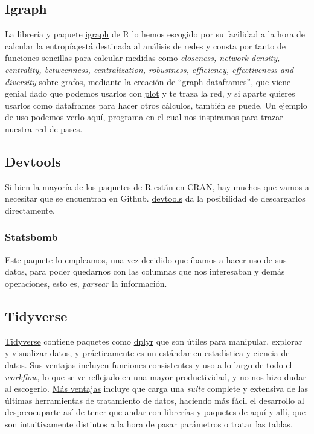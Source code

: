 \subsection{Igraph}
La librería y paquete \href{https://igraph.org/r/}{igraph} de R lo hemos escogido por su facilidad a la hora de 
calcular la entropía;está destinada al análisis de redes y consta por tanto de \href{https://kateto.net/netscix2016.html}{funciones sencillas} para calcular 
medidas como \textit{closeness, network density, centrality, betweenness, centralization, robustness, 
efficiency, effectiveness and diversity} sobre grafos, mediante la 
creación de \href{https://igraph.org/r/doc/graph_from_data_frame.html}{``graph dataframes''}, que viene genial 
dado que podemos usarlos con \href{https://www.rdocumentation.org/packages/graphics/versions/3.6.2/topics/plot}{plot} 
y te traza la red, y si aparte quieres usarlos como dataframes para hacer otros cálculos, también se puede. Un ejemplo 
de uso podemos verlo \href{https://github.com/JJ/venice-patrician-social-network/blob/main/patrician-social-network.R}{aquí}, 
programa en el cual nos inspiramos para trazar nuestra red de pases.

\subsection{Devtools}
Si bien la mayoría de los paquetes de R están en \href{https://cran.r-project.org/}{CRAN}, hay muchos que vamos 
a necesitar que se encuentran en Github. \href{https://www.r-project.org/nosvn/pandoc/devtools.html}{devtools} da 
la posibilidad de descargarlos directamente.

\subsubsection{Statsbomb}
\href{https://github.com/statsbomb/StatsBombR}{Este paquete} lo empleamos, una vez decidido que íbamos a hacer 
uso de sus datos, para poder quedarnos con las columnas que nos interesaban y demás operaciones, esto es, \textit{parsear} 
la información. 

\subsection{Tidyverse}
\href{http://www.storybench.org/getting-started-with-tidyverse-in-r/}{Tidyverse} contiene paquetes como 
\href{https://dplyr.tidyverse.org/}{dplyr} que son útiles para manipular, explorar y visualizar datos, y 
prácticamente es un estándar en estadística y ciencia de datos. \href{https://rviews.rstudio.com/2017/06/08/what-is-the-tidyverse/}{Sus ventajas} 
incluyen funciones consistentes y uso a lo largo de todo el \textit{workflow}, lo que se ve reflejado en una 
mayor productividad, y no nos hizo dudar al escogerlo. \href{https://www.r-bloggers.com/2018/09/why-learn-the-tidyverse/}{Más ventajas} incluye 
que carga una \textit{suite} complete y extensiva de las últimas herramientas de tratamiento de datos, haciendo más 
fácil el desarrollo al despreocuparte así de tener que andar con librerías y paquetes de aquí y allí, que son 
intuitivamente distintos a la hora de pasar parámetros o tratar las tablas.

